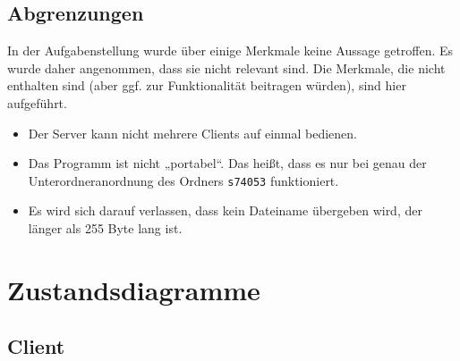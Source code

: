 \subsection{Abgrenzungen}
\label{abgrenz}
In der Aufgabenstellung wurde über einige Merkmale keine Aussage getroffen. Es wurde daher angenommen, dass sie nicht relevant sind. Die Merkmale, die nicht enthalten sind (aber ggf. zur Funktionalität beitragen würden), sind hier aufgeführt.
\begin{itemize}
\item Der Server kann nicht mehrere Clients auf einmal bedienen.
\item Das Programm ist nicht „portabel“. Das heißt, dass es nur bei genau der Unterordneranordnung des Ordners \texttt{s74053} funktioniert.
\item Es wird sich darauf verlassen, dass kein Dateiname übergeben wird, der länger als 255 Byte lang ist.
\end{itemize}

\section{Zustandsdiagramme}
\label{stated}
\subsection{Client}
\begin{center}
\end{center}

